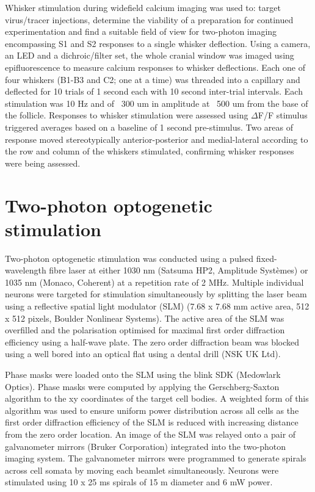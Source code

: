 Whisker stimulation during widefield calcium imaging was used to: target virus/tracer injections, determine the viability of a preparation for continued experimentation and find a suitable field of view for two-photon imaging encompassing S1 and S2 responses to a single whisker deflection. Using a camera, an LED and a dichroic/filter set, the whole cranial window was imaged using epifluorescence to measure calcium responses to whisker deflections. Each one of four whiskers (B1-B3 and C2; one at a time) was threaded into a capillary and deflected for 10 trials of 1 second each with 10 second inter-trial intervals. Each stimulation was 10 Hz and of ~300 um in amplitude at ~500 um from the base of the follicle. Responses to whisker stimulation were assessed using $\Delta$F/F stimulus triggered averages based on a baseline of 1 second pre-stimulus. Two areas of response moved stereotypically anterior-posterior and medial-lateral according to the row and column of the whiskers stimulated, confirming whisker responses were being assessed.

\section{Two-photon optogenetic stimulation}

Two-photon optogenetic stimulation was conducted using a pulsed fixed-wavelength fibre laser at either 1030 nm (Satsuma HP2, Amplitude Systèmes) or 1035 nm (Monaco, Coherent) at a repetition rate of 2 MHz. Multiple individual neurons were targeted for stimulation simultaneously by splitting the laser beam using a reflective spatial light modulator (SLM) (7.68 x 7.68 mm active area, 512 x 512 pixels, Boulder Nonlinear Systems). The active area of the SLM was overfilled and the polarisation optimised for maximal first order diffraction efficiency using a half-wave plate. The zero order diffraction beam was blocked using a well bored into an optical flat using a dental drill (NSK UK Ltd).

Phase masks were loaded onto the SLM using the blink SDK (Medowlark Optics). Phase masks were computed by applying the Gerschberg-Saxton algorithm \cite{gerchberg_practical_1972} to the xy coordinates of the target cell bodies. A weighted form of this algorithm was used to ensure uniform power distribution across all cells as the first order diffraction efficiency of the SLM is reduced with increasing distance from the zero order location. An image of the SLM was relayed onto a pair of galvanometer mirrors (Bruker Corporation) integrated into the two-photon imaging system. The galvanometer mirrors were programmed to generate spirals across cell somata by moving each beamlet simultaneously. Neurons were stimulated using 10 x 25 ms spirals of 15 \textmu m diameter and 6 mW power.

